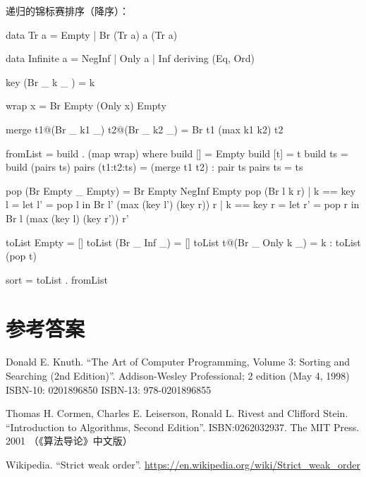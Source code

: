 \documentclass[b5paper]{ctexart}
\begin{document}
递归的锦标赛排序（降序）：

\begin{Haskell}
data Tr a = Empty | Br (Tr a) a (Tr a)

data Infinite a = NegInf | Only a | Inf deriving (Eq, Ord)

key (Br _ k _ ) = k

wrap x = Br Empty (Only x) Empty

merge t1@(Br _ k1 _) t2@(Br _ k2 _) = Br t1 (max k1 k2) t2

fromList = build . (map wrap) where
  build [] = Empty
  build [t] = t
  build ts = build (pairs ts)
  pairs (t1:t2:ts) = (merge t1 t2) : pair ts
  pairs ts = ts

pop (Br Empty _ Empty) = Br Empty NegInf Empty
pop (Br l k r) | k == key l = let l' = pop l in Br l' (max (key l') (key r)) r
               | k == key r = let r' = pop r in Br l (max (key l) (key r')) r'

toList Empty = []
toList (Br _ Inf _) = []
toList t@(Br _ Only k _) = k : toList (pop t)

sort = toList . fromList
\end{Haskell}

\ifx\wholebook\relax\else
\section{参考答案}
\shipoutAnswer

\begin{thebibliography}{99}

Donald E. Knuth. ``The Art of Computer Programming, Volume 3: Sorting and Searching (2nd Edition)''. Addison-Wesley Professional; 2 edition (May 4, 1998) ISBN-10: 0201896850 ISBN-13: 978-0201896855

Thomas H. Cormen, Charles E. Leiserson, Ronald L. Rivest and Clifford Stein.
``Introduction to Algorithms, Second Edition''. ISBN:0262032937. The MIT Press. 2001 （《算法导论》中文版）

Wikipedia. ``Strict weak order''. \url{https://en.wikipedia.org/wiki/Strict_weak_order}

\end{thebibliography}

\expandafter\enddocument
\fi
\end{document}
